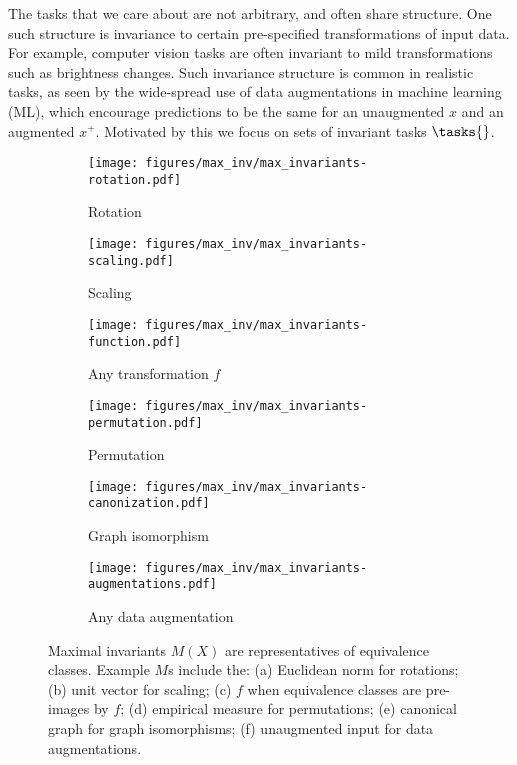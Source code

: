\documentclass[final]{article}
\begin{document}
The tasks that we care about are not arbitrary, and often share structure. 
One such structure is invariance to certain pre-specified transformations of input data. For example, computer vision tasks are often invariant to mild transformations such as brightness changes.
Such invariance structure is common in realistic tasks, as seen by the wide-spread use  of data augmentations \cite{shorten_survey_2019} in machine learning (ML), which encourage predictions to be the same for an unaugmented $x$ and an augmented $x^+$.
Motivated by this we focus on sets of invariant tasks  $\tasks{}$.
\begin{figure}[t]
\centering
 \begin{subfigure}{0.30\linewidth}
\texttt{[image: figures/max\_inv/max\_invariants-rotation.pdf]}
\vspace*{-1.5em}
  \caption{Rotation}
 \label{fig:Mx_rot}
 \end{subfigure}
\quad
\begin{subfigure}{0.30\linewidth}
\texttt{[image: figures/max\_inv/max\_invariants-scaling.pdf]}
\vspace*{-1.5em}
  \caption{Scaling}
  \label{fig:Mx_scaling}
 \end{subfigure}
\quad
\begin{subfigure}{0.30\linewidth}
\texttt{[image: figures/max\_inv/max\_invariants-function.pdf]}
\vspace*{-1.5em}
  \caption{Any transformation $f$}
  \label{fig:Mx_f}
 \end{subfigure}
\hfill
\begin{subfigure}{0.30\linewidth}
\texttt{[image: figures/max\_inv/max\_invariants-permutation.pdf]}
\vspace*{-1.5em}
  \caption{Permutation}
 \label{fig:Mx_perm}
 \end{subfigure}
\quad
\begin{subfigure}{0.30\linewidth}
\texttt{[image: figures/max\_inv/max\_invariants-canonization.pdf]}
\vspace*{-1.5em}
  \caption{Graph isomorphism }
  \label{fig:Mx_graph}
  \end{subfigure}
\quad
\begin{subfigure}{0.30\linewidth}
\texttt{[image: figures/max\_inv/max\_invariants-augmentations.pdf]}
\vspace*{-1.5em}
  \caption{Any data augmentation}
  \label{fig:Mx_aug}
  \end{subfigure}
\caption{Maximal invariants $M(X)$ are representatives of equivalence classes.
Example $M$s include the: (a) Euclidean norm for rotations; (b)  unit vector for scaling; (c) $f$ when equivalence classes are pre-images by $f$; (d) empirical measure for permutations; (e) canonical graph for graph isomorphisms; (f) unaugmented input for data augmentations.}
  \label{fig:max_inv}
\end{figure}
 
\end{document}
